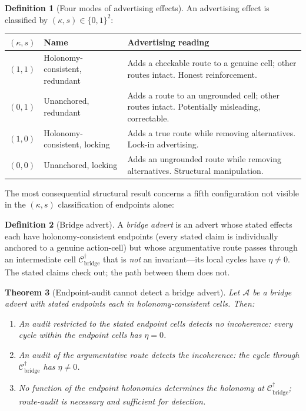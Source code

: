 \documentclass[twocolumn,11pt,a4paper]{article}
\theoremstyle{adv}
\newtheorem{theorem}{Theorem}[section]
\theoremstyle{definition}
\newtheorem{definition}[theorem]{Definition}
\theoremstyle{remark}
\newcommand{\Cell}{\mathcal{C}}        %
\newcommand{\Adv}{\mathcal{A}}        %
\begin{document}
\begin{definition}[Four modes of advertising effects]
\label{def:four-modes}
An advertising effect is classified by $(\kappa,s)\in\{0,1\}^2$:
\begin{center}
\begin{tabular}{clp{6.3cm}}
\toprule
$(\kappa,s)$ & Name & Advertising reading \\
\midrule
$(1,1)$ & Holonomy-consistent, redundant & Adds a checkable route to a genuine cell;
          other routes intact. Honest reinforcement.\\
$(0,1)$ & Unanchored, redundant & Adds a route to an ungrounded cell;
          other routes intact. Potentially misleading, correctable.\\
$(1,0)$ & Holonomy-consistent, locking & Adds a true route while removing
          alternatives. Lock-in advertising.\\
$(0,0)$ & Unanchored, locking & Adds an ungrounded route while removing
          alternatives. Structural manipulation.\\
\bottomrule
\end{tabular}
\end{center}
\end{definition}

The most consequential structural result concerns a fifth configuration not
visible in the $(\kappa,s)$ classification of endpoints alone:

\begin{definition}[Bridge advert]
\label{def:bridge-advert}
A \emph{bridge advert} is an advert whose stated effects each have
holonomy-consistent endpoints (every stated claim is individually anchored to a
genuine action-cell) but whose argumentative route passes through an intermediate
cell $\Cell^\dagger_\mathrm{bridge}$ that is \emph{not} an invariant---its
local cycles have $\eta\neq0$. The stated claims check out; the path between
them does not.
\end{definition}

\begin{theorem}[Endpoint-audit cannot detect a bridge advert]
\label{thm:bridge-ad}
Let $\Adv$ be a bridge advert with stated endpoints each in holonomy-consistent
cells. Then:
\begin{enumerate}[label=\textup{(\roman*)},leftmargin=2.2em]
\item An audit restricted to the stated endpoint cells detects no incoherence:
      every cycle within the endpoint cells has $\eta=0$.
\item An audit of the argumentative route detects the incoherence: the cycle
      through $\Cell^\dagger_\mathrm{bridge}$ has $\eta\neq0$.
\item No function of the endpoint holonomies determines the holonomy at
      $\Cell^\dagger_\mathrm{bridge}$; route-audit is necessary and sufficient
      for detection.
\end{enumerate}
\end{theorem}
\end{document}
